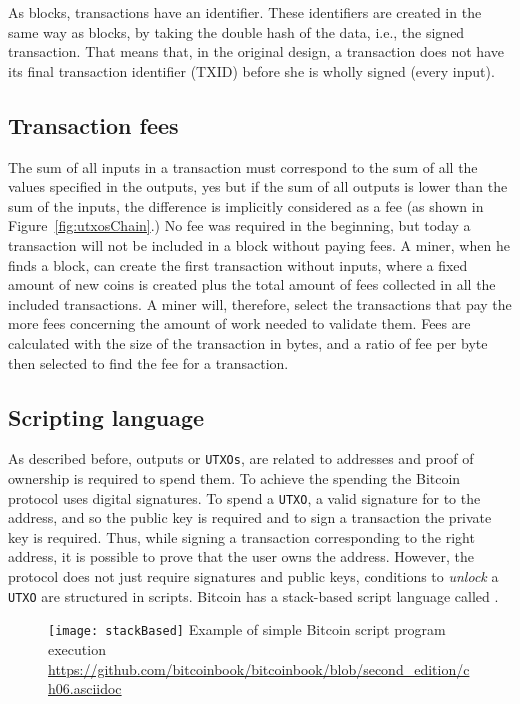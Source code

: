 As blocks, transactions have an identifier. These identifiers are created in the
same way as blocks, by taking the double hash of the data, i.e., the signed
transaction. That means that, in the original design, a transaction does not
have its final transaction identifier (TXID) before she is wholly signed (every
input).

\subsection{Transaction fees}

The sum of all inputs in a transaction must correspond to the sum of all the
values specified in the outputs, yes but if the sum of all outputs is lower than
the sum of the inputs, the difference is implicitly considered as a fee (as
shown in Figure~\ref{fig:utxosChain}.) No fee was required in the beginning, but
today a transaction will not be included in a block without paying fees. A
miner, when he finds a block, can create the first transaction without inputs,
where a fixed amount of new coins is created plus the total amount of fees
collected in all the included transactions. A miner will, therefore, select the
transactions that pay the more fees concerning the amount of work needed to
validate them. Fees are calculated with the size of the transaction in bytes,
and a ratio of fee per byte then selected to find the fee for a transaction.

\subsection{Scripting language}

As described before, outputs or \texttt{UTXOs}, are related to addresses and
proof of ownership is required to spend them. To achieve the spending the
Bitcoin protocol uses digital signatures. To spend a \texttt{UTXO}, a valid
signature for to the address, and so the public key is required and to sign a
transaction the private key is required. Thus, while signing a transaction
corresponding to the right address, it is possible to prove that the user owns
the address. However, the protocol does not just require signatures and public
keys, conditions to \textit{unlock} a \texttt{UTXO} are structured in scripts.
Bitcoin has a stack-based script language called .

\begin{figure}[H]
	\centering
	\texttt{[image: stackBased]}
  {Example of simple Bitcoin script program execution}
	{\url{https://github.com/bitcoinbook/bitcoinbook/blob/second_edition/ch06.asciidoc}}
	\label{fig:stackBased}
\end{figure}

